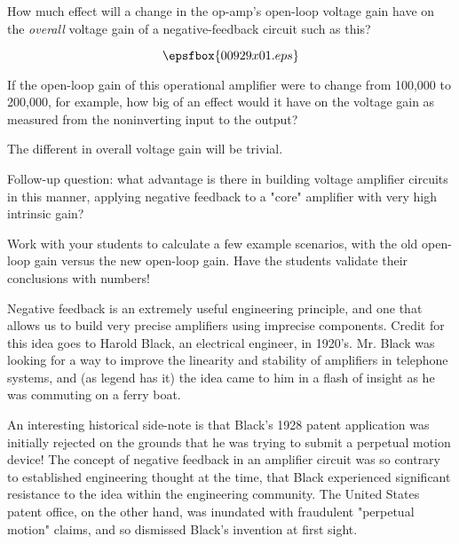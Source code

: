 

How much effect will a change in the op-amp's open-loop voltage gain have on the {\it overall} voltage gain of a negative-feedback circuit such as this?

$$\epsfbox{00929x01.eps}$$

If the open-loop gain of this operational amplifier were to change from 100,000 to 200,000, for example, how big of an effect would it have on the voltage gain as measured from the noninverting input to the output?







The different in overall voltage gain will be trivial.

\vskip 10pt

Follow-up question: what advantage is there in building voltage amplifier circuits in this manner, applying negative feedback to a "core" amplifier with very high intrinsic gain?







Work with your students to calculate a few example scenarios, with the old open-loop gain versus the new open-loop gain.  Have the students validate their conclusions with numbers!

Negative feedback is an extremely useful engineering principle, and one that allows us to build very precise amplifiers using imprecise components.  Credit for this idea goes to Harold Black, an electrical engineer, in 1920's.  Mr. Black was looking for a way to improve the linearity and stability of amplifiers in telephone systems, and (as legend has it) the idea came to him in a flash of insight as he was commuting on a ferry boat.

An interesting historical side-note is that Black's 1928 patent application was initially rejected on the grounds that he was trying to submit a perpetual motion device!  The concept of negative feedback in an amplifier circuit was so contrary to established engineering thought at the time, that Black experienced significant resistance to the idea within the engineering community.  The United States patent office, on the other hand, was inundated with fraudulent "perpetual motion" claims, and so dismissed Black's invention at first sight.




